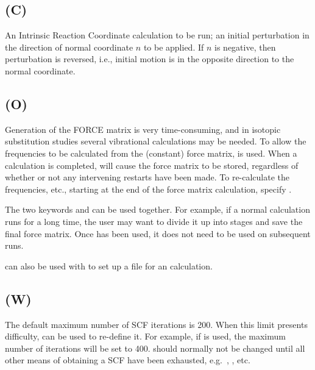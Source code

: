 \subsection*{ (C)}
An Intrinsic Reaction Coordinate calculation to be run;  an  initial
perturbation in the direction of normal coordinate $n$ to be applied.  If $n$
is negative, then perturbation is reversed, i.e., initial  motion  is  in
the  opposite direction to the normal coordinate.



\subsection*{ (O)}
Generation of the  FORCE  matrix  is  very  time-consuming,  and  in
isotopic  substitution  studies  several  vibrational calculations may be
needed.  To allow the frequencies to be calculated  from  the  (constant)
force  matrix,    is used.  When a  calculation is completed,
 will cause the force matrix to be stored, regardless  of  whether
or  not  any  intervening  restarts  have been made.  To re-calculate the
frequencies, etc.,  starting at the end of the force  matrix  calculation,
specify .

The two keywords  and   can  be  used  together.   For
example, if a normal  calculation runs for a long time, the user may
want to divide it up into stages and save the final force  matrix.   Once
  has been used, it does not need to be used on subsequent
runs.

 can also be used with  to set up a  file for  an
 calculation.



\subsection*{ (W)}
The default maximum number of SCF  iterations  is  200.   When  this
limit  presents  difficulty,    can  be used to re-define it.  For
example, if  is used, the maximum number of  iterations  will  be
set to 400.   should normally not be changed until all other means of
obtaining a SCF have been exhausted, e.g.\  , , etc.



